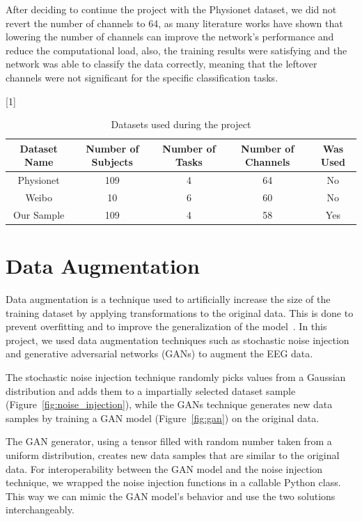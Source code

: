 After deciding to continue the project with the Physionet dataset, we did not revert the number of channels to 64, as many literature works have shown that lowering the number of channels can improve the network's performance and reduce the computational load, also, the training results were satisfying and the network was able to classify the data correctly, meaning that the leftover channels were not significant for the specific classification tasks.
\begin{table}[!htbp]
    \centering
    \scalebox{.8}[1]{
    \begin{tabular}{|c|c|c|c||c|}
        \hline
        \textbf{Dataset Name} & \textbf{Number of Subjects} & \textbf{Number of Tasks} & \textbf{Number of Channels} & \textbf{Was Used}\\
        \hline
        \hline
        Physionet & 109 & 4 & 64 & No\\
        \hline
        Weibo & 10 & 6 & 60 & No\\
        \hline
        Our Sample & 109 & 4 & 58 & Yes \\
        \hline
    \end{tabular}
    }
    \caption{Datasets used during the project}
    \label{tab:datasamples}
\end{table}


\section{Data Augmentation}
Data augmentation is a technique used to artificially increase the size of the training dataset by applying transformations to the original data.
This is done to prevent overfitting and to improve the generalization of the model~\cite{wen2020time}.
In this project, we used data augmentation techniques such as stochastic noise injection and generative adversarial networks (GANs) to augment the EEG data.

The stochastic noise injection technique randomly picks values from a Gaussian distribution and adds them to a impartially selected dataset sample (Figure~\ref{fig:noise_injection}), while the GANs technique generates new data samples by training a GAN model (Figure~\ref{fig:gan}) on the original data.

The GAN generator, using a tensor filled with random number taken from a uniform distribution, creates new data samples that are similar to the original data.
For interoperability between the GAN model and the noise injection technique, we wrapped the noise injection functions in a callable Python class.
This way we can mimic the GAN model's behavior and use the two solutions interchangeably.

